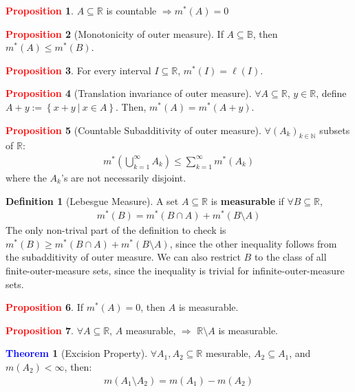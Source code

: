 \documentclass[11pt]{article}
\theoremstyle{definition}
\newcommand{\bb}[1]{\mathbb{#1}}
\newcommand{\sets}[2]{ \left\{ #1\ |\ #2 \right\}}
\newtheorem{theorem}{\textcolor{blue}{Theorem}}
\theoremstyle{definition}
\newtheorem{definition}{\textcolor{OliveGreen}{Definition}}
\newtheorem{prop}{\textcolor{red}{Proposition}}
\theoremstyle{remark}
\begin{document}
\begin{prop}
	$A \subseteq \bb{R}$ is countable $\Rightarrow m^*(A) = 0$ 
\end{prop}
\begin{prop}[Monotonicity of outer measure]
		If $A \subseteq \bb{B}$, then $m^*(A) \leq m^*(B)$. 
\end{prop}
\begin{prop}
	For every interval $I \subseteq \bb{R}$, $m^*(I) = \ell(I)$. 	
\end{prop}
\begin{prop}[Translation invariance of outer measure]
	$\forall A \subseteq \bb{R}$, $ y \in \bb{R}$, define $A+y := \sets{x+y}{x \in A}$. Then, $m^*(A) = m^*(A+y)$. 
\end{prop}

\begin{prop}[Countable Subadditivity of outer measure] 
	$\forall (A_k)_{k \in \bb{N}}$ subsets of $\bb{R}$: 
	\begin{align}
		m^* \left(  \bigcup_{k=1}^\infty A_k \right)  \leq \sum_{k=1}^\infty m^*(A_k) 
	\end{align}
	where the $A_k$'s are not necessarily disjoint. 
\end{prop}

\begin{definition}[Lebesgue Measure]
	A set $A \subseteq \bb{R}$ is \textbf{measurable} if $\forall B \subseteq \bb{R}$, 
	\begin{align}
		m^*(B) = m^*(B \cap A) + m^*(B \setminus A) 
	\end{align}
	The only non-trival part of the definition to check is $		m^*(B) \geq m^*(B \cap A) + m^*(B \setminus A) $, since the other inequality follows from the subadditivity of outer measure. We can also restrict $B$ to the class of all finite-outer-measure sets, since the inequality is trivial for infinite-outer-measure sets. 
\end{definition}

\begin{prop}
	If $m^*(A) = 0$, then $A$ is measurable. 
\end{prop}

\begin{prop}
	$\forall A \subseteq \bb{R}$, $A$ measurable, $\Rightarrow$ $\bb{R} \setminus A$ is measurable. 
\end{prop}

\begin{theorem}[Excision Property]
	$\forall A_1, A_2 \subseteq \bb{R}$ mesurable, $A_2 \subseteq A_1$, and $m(A_2) < \infty$, then: 
	\begin{align}
		m(A_1 \setminus A_2) = m(A_1) - m(A_2) 
	\end{align}	
\end{theorem}
\end{document}
